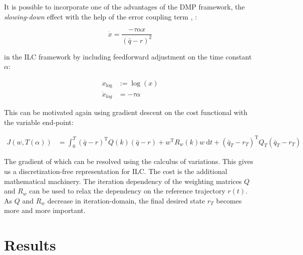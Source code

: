 \documentclass[10pt,a4paper]{article}
\newcommand{\joint}{q} %
\newcommand{\state}{\bar{\joint}} %
\newcommand{\traj}{r} %
\newcommand{\phase}{x} %
\newcommand{\weights}{w} %
\begin{document}
It is possible to incorporate one of the advantages of the DMP framework, the \emph{slowing-down} effect with the help of the error coupling term \cite{Schaal07}, \cite{Ijspeert13}:

\begin{equation}
\dot{\phase} = \frac{-\tau\alpha\phase}{(\state - \traj)^2}
\label{phaseWithErrorCoupling}
\end{equation}

in the ILC framework by including feedforward adjustment on the time constant $\alpha$:

\begin{equation}
\begin{aligned}
\phase_{\log} &:= \log(\phase) \\
\dot{\phase}_{log} &= -\tau\alpha
\label{logPhase}
\end{aligned}
\end{equation}

This can be motivated again using gradient descent on the cost functional with the variable end-point:

\begin{equation}
\begin{aligned}
J(\weights,T(\alpha)) &= \int_{0}^{T} (\state - \traj)^{\mathrm{T}}Q(k)(\state - \traj) + \weights^{\mathrm{T}}R_w(k)\weights \ \mathrm{d}t + (\state_T-\traj_T)^{\mathrm{T}}Q_{T}(\state_T-\traj_T) 
\end{aligned}
\label{costTimeVarying}
\end{equation}

The gradient of which can be resolved using the calculus of variations. This gives us a discretization-free representation for ILC. The cost is the additional mathematical machinery. The iteration dependency of the weighting matrices $Q$ and $R_{\weights}$ can be used to relax the dependency on the reference trajectory $\traj(t)$. As $Q$ and $R_{\weights}$ decrease in iteration-domain, the final desired state $\traj_{T}$ becomes more and more important.

\section{Results}\label{results}

\end{document}

